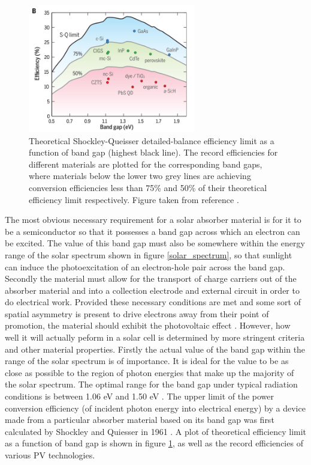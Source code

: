 \begin{figure}[h!]
  \centering
    \includegraphics[width=0.65\textwidth]{figures/SQ_new.png}
    \caption{Theoretical Shockley-Queisser detailed-balance efficiency limit as a function of band gap\cite{SQ_1961} (highest black line). The record efficiencies for different materials are plotted for the corresponding band gaps, where materials below the lower two grey lines are achieving conversion efficiencies less than 75\% and 50\% of their theoretical efficiency limit respectively. Figure taken from reference .}
  \label{SQ}
\end{figure}

The most obvious necessary requirement for a solar absorber material is for it to be a semiconductor so that it possesses a band gap across which an electron can be excited. The value of this band gap must also be somewhere within the energy range of the solar spectrum shown in figure \ref{solar_spectrum}, so that sunlight can induce the photoexcitation of an electron-hole pair across the band gap. Secondly the material must allow for the transport of charge carriers out of the absorber material and into a collection electrode and external circuit in order to do electrical work. Provided these necessary conditions are met and some sort of spatial asymmetry is present to drive electrons away from their point of promotion, the material should exhibit the photovoltaic effect \cite{Nelson2}. However, how well it will actually peform in a solar cell is determined by more stringent criteria and other material properties. Firstly the actual value of the band gap within the range of the solar spectrum is of importance. It is ideal for the value to be as close as possible to the region of photon energies that make up the majority of the solar spectrum. The optimal range for the band gap under typical radiation conditions is between 1.06 eV and 1.50 eV \cite{CZTS_book}. The upper limit of the power conversion efficiency (of incident photon energy into electrical energy) by a device made from a particular absorber material based on its band gap was first calculated by Shockley and Quiesser in 1961 \cite{SQ_1961}. A plot of theoretical efficiency limit as a function of band gap is shown in figure \ref{SQ}, as well as the record efficiencies of various PV technologies.

